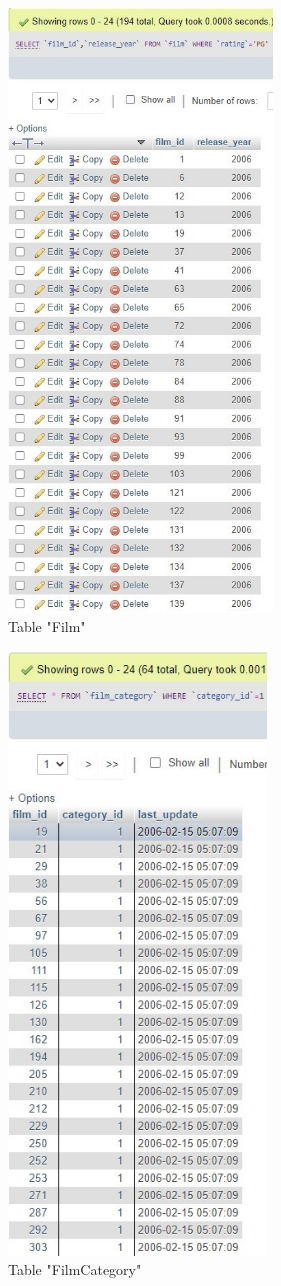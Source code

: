 \documentclass[openany]{article}
\begin{document}
		\begin{figure}[H]
			\includegraphics[height = 16cm]{film_selectwhere}
			\caption{Table "Film"}
		\end{figure}
		\begin{figure}[H]
			\includegraphics[height = 16cm]{filmcategory_selectwhere}
			\caption{Table "Film\textunderscore Category"}
		\end{figure}
\end{document}
